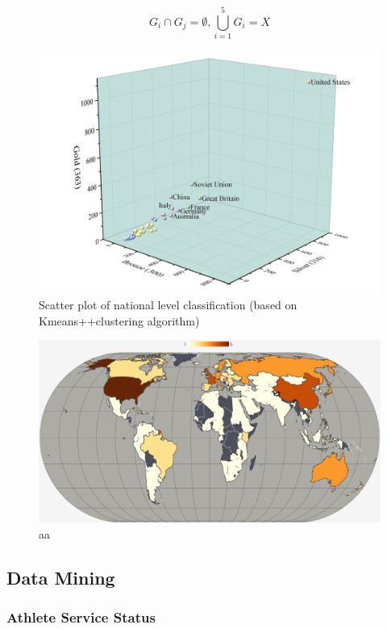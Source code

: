 \documentclass[12pt]{article}  %
\begin{document}
\begin{equation}
G_{i} \cap G_{j}=\emptyset, \bigcup_{i=1}^{5} G_{i}=X
\end{equation}
\begin{figure}[htbp]
	\centering
	\includegraphics[width=12cm]{img/Level1.png}
	\caption{Scatter plot of national level classification (based on Kmeans++clustering algorithm)}
	\label{fig:aa}
\end{figure}

\begin{figure}[htbp]
	\centering
	\includegraphics[width=12cm]{img/Level2.png}
	\caption{aa}
	\label{fig:aa}
\end{figure}









\subsection{Data Mining}
\subsubsection{Athlete Service Status}
\end{document}
